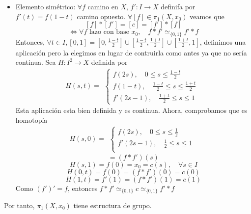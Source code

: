 \begin{dem}
\begin{itemize}
  \item Elemento simétrico: $\forall f$ camino en $X$, $f' : I \to X$ definifa por $f'(t) = f(1 - t)$ camino opuesto. $\forall [f] \in \pi_{1}(X, x_{0})$ veamos que 
    \[ 
      [f] * [f'] = [c] = [f'] * [f] 
    \] 
    \[ 
      \Leftrightarrow \forall f \text{ lazo con base } x_{0}, \quad f * f' \simeq_{\{ 0, 1 \}} f' * f 
    \] 
    Entonces, $\forall t \in I, [0, 1] = [0, \frac{1 - t}{2}] \cup [\frac{1 - t}{2}, \frac{1 + t}{2}] \cup [\frac{1 + t}{2}, 1]$, definimos una aplicación pero la elegimos en lugar de contruirla como antes ya que no sería continua. Sea $H : I^{2} \to X$ definida por
    \[ 
      H(s,t)  =
      \begin{aligned}
        \begin{cases}
          f(2s), \quad 0 \leq s \leq \frac{1 - t}{2} \\
          f(1 - t), \quad \frac{1 - t}{2} \leq s \leq \frac{1 + t}{2} \\
          f'(2s - 1), \quad \frac{1 + t}{2} \leq s \leq 1
        \end{cases}
      \end{aligned} 
    \] 
    Esta aplicación esta bien definida y es continua. Ahora, comprobamos que es homotopía
    \[ 
      H(s,0) =
      \begin{aligned}
        \begin{cases}
          f(2s), \quad 0 \leq s \leq \frac{1}{2} \\
          f'(2s - 1), \quad \frac{1}{2} \leq s \leq 1 \\
        \end{cases}
      \end{aligned} 
    \] 
    \[ 
      = (f * f')(s) 
    \] 
    \[ 
      H(s, 1) = f(0) = x_{0} = c(s), \quad \forall s \in I
    \] 
    \[ 
      H(0, t) = f(0) = (f * f')(0) = c(0)
    \] 
    \[ 
      H(1, t) = f'(1) = (f * f')(1) = c(1)
    \] 
    Como $(f')' = f$, entonces $f * f' \simeq_{\{ 0, 1 \}} c \simeq_{\{ 0, 1 \}} f' * f$
  \end{itemize}
  Por tanto, $\pi_{1}(X, x_{0})$ tiene estructura de grupo.
\end{dem}
